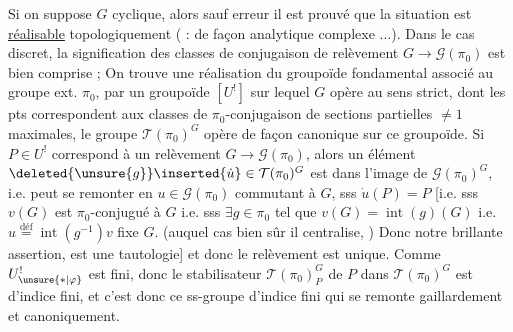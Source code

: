 Si on suppose $G$ cyclique, alors sauf
erreur il est prouvé que la situation est
\uline{réalisable} topologiquement ( :
\uline{} de façon analytique complexe $\ldots$).
Dans le cas discret, la signification des classes de
conjugaison de relèvement
$G\longrightarrow\mathcal G(\pi_0)$ est bien comprise ;
On trouve une  réalisation
 du groupoïde fondamental
associé au
groupe ext. $\pi_0$, par un groupoïde  $[U^{!}]$
sur lequel $G$ opère au sens strict, dont les pts
correspondent aux classes de $\pi_0$-conjugaison de sections
partielles $\ne1$ maximales, le groupe
$\mathcal T(\pi_0)^G$
opère de façon  canonique sur ce groupoïde.
Si $P\in U^{!}$ correspond à un relèvement
$G\longrightarrow\mathcal G(\pi_0)$, alors
un élément $\deleted{\unsure{g}}\inserted{\dot u}\in
\mathcal T(\pi_0)^G$ est dans l'image de
$\mathcal G(\pi_0)^G$, i.e. peut se remonter en
$u\in\mathcal G(\pi_0)$ commutant à $G$, sss
$\dot u(P)=P$ [i.e. sss
$v(G)$ est $\pi_0$-conjugué à $G$
i.e. sss $\exists g\in\pi_0$ tel que
$v(G)=\operatorname{int}(g)(G)$
i.e. 
$u\overset{\text{déf}}{=}\operatorname{int}(g^{-1})v$ fixe $G$.
 (auquel cas bien sûr il centralise,
)
Donc notre brillante assertion, est une tautologie]
et donc le relèvement est unique. Comme
$U^{!}_{\unsure{*|\varphi}}$ est fini, donc le stabilisateur
$\mathcal T(\pi_0)^G_P$ de $P$ dans
$\mathcal T(\pi_0)^G$ est d'indice fini,
et c'est donc ce ss-groupe d'indice fini qui se remonte
gaillardement et canoniquement.

